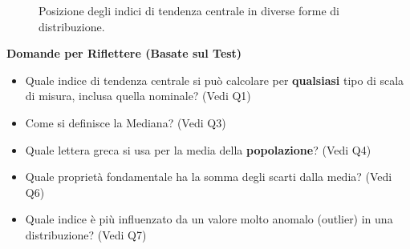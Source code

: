 \documentclass[12pt, a4paper]{article}
\newenvironment{reflectionbox}{%
    \medskip %
    \begin{framed}\par\noindent
    \textbf{\color{boxtitlecolor}Domande per Riflettere (Basate sul Test)} \par
    \begin{itemize}[leftmargin=*, label=$\blacktriangleright$]
}{%
    \end{itemize}\par
    \end{framed}
    \medskip %
}
\begin{document}
\begin{figure}[ht]
\begin{tikzpicture}[scale=0.8, every node/.style={scale=0.8}]
\end{tikzpicture}
\caption{Posizione degli indici di tendenza centrale in diverse forme di distribuzione.}
\label{fig:distribuzioni}
\end{figure}

\clearpage %

\begin{reflectionbox}
    \item Quale indice di tendenza centrale si può calcolare per \textbf{qualsiasi} tipo di scala di misura, inclusa quella nominale? (Vedi Q1)
    \item Come si definisce la Mediana? (Vedi Q3)
    \item Quale lettera greca si usa per la media della \textbf{popolazione}? (Vedi Q4)
    \item Quale proprietà fondamentale ha la somma degli scarti dalla media? (Vedi Q6)
    \item Quale indice è più influenzato da un valore molto anomalo (outlier) in una distribuzione? (Vedi Q7)
\end{reflectionbox}

\end{document}
